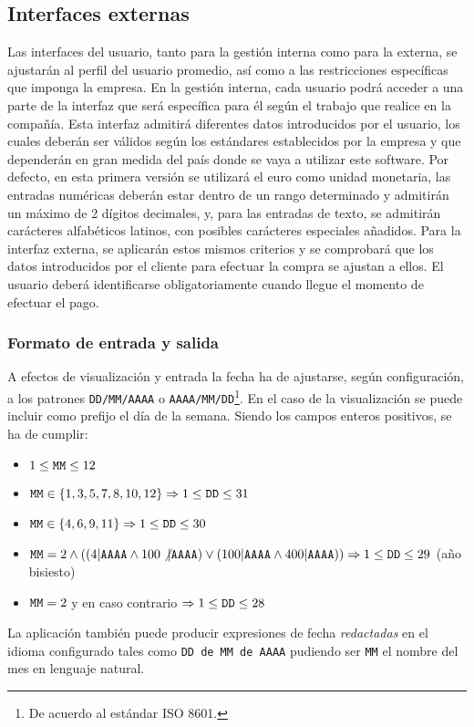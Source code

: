 \documentclass[11pt, a4paper, twoside, titlepage]{article}
\begin{document}
		\subsection{Interfaces externas}
			Las interfaces del usuario, tanto para la gestión interna como para la externa, se ajustarán al perfil del usuario promedio, así como a las restricciones específicas que imponga la empresa. En la gestión interna, cada usuario podrá acceder a una parte de la interfaz que será específica para él según el trabajo que realice en la compañía. Esta interfaz admitirá diferentes datos introducidos por el usuario, los cuales deberán ser válidos según los estándares establecidos por la empresa y que dependerán en gran medida del país donde se vaya a utilizar este software. Por defecto, en esta primera versión se utilizará el euro como unidad monetaria, las entradas numéricas deberán estar dentro de un rango determinado y admitirán un máximo de 2 dígitos decimales, y, para las entradas de texto, se admitirán carácteres alfabéticos latinos, con posibles carácteres especiales añadidos. Para la interfaz externa, se aplicarán estos mismos criterios y se comprobará que los datos introducidos por el cliente para efectuar la compra se ajustan a ellos. El usuario deberá identificarse obligatoriamente cuando llegue el momento de efectuar el pago.
			

		\subsubsection{Formato de entrada y salida}

				A efectos de visualización y entrada la fecha ha de ajustarse, según configuración, a los patrones \verb|DD/MM/AAAA| o \verb|AAAA/MM/DD|\footnote{De acuerdo al estándar ISO 8601.}. En el caso de la visualización se puede incluir como prefijo el día de la semana. Siendo los campos enteros positivos, se ha de cumplir:
				\begin{itemize}
					\item $1 \leq \verb|MM| \leq 12$
					\item $\verb|MM| \in \{1, 3, 5, 7, 8, 10, 12\} \Rightarrow 1 \leq \verb|DD| \leq 31$
					\item $\verb|MM| \in \{4, 6, 9, 11\} \Rightarrow 1 \leq \verb|DD| \leq 30$ 
					\item $\verb|MM| = 2 \wedge ((4 | \verb|AAAA| \wedge 100 \not| \verb|AAAA|) \vee (100 | \verb|AAAA| \wedge 400 | \verb|AAAA|)) \Rightarrow 1 \leq \verb|DD| \leq 29$ (año bisiesto)
					\item $\verb|MM| = 2$ y en caso contrario $\Rightarrow 1 \leq \verb|DD| \leq 28$
				\end{itemize}
			La aplicación también puede producir expresiones de fecha \textit{redactadas} en el idioma configurado tales como \verb|DD de MM de AAAA| pudiendo ser \verb|MM| el nombre del mes en lenguaje natural.\\
\end{document}
